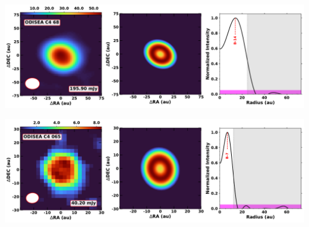 \noindent
\begin{minipage}{.49\textwidth}
	 \centering
	 	 \hrulesep
	 	 \includegraphics[width=1\linewidth]{pdf/4+I_F/080_odisea_c4_68_cutout.pdf}
\end{minipage}%
\vrulesep
\begin{minipage}{.49\textwidth}
	 \centering
	 	 \hrulesep
	 	 \includegraphics[width=1\linewidth]{pdf/4+I_F/046_odisea_c4_065_cutout.pdf}
\end{minipage}%
\vspace{0.8cm}